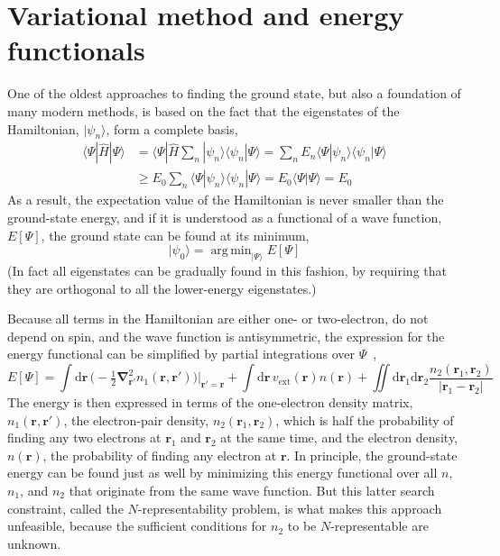\section{Variational method and energy functionals}

One of the oldest approaches to finding the ground state, but also a foundation of many modern methods, is based on the fact that the eigenstates of the Hamiltonian, $|\psi_n\rangle$, form a complete basis,
\begin{equation}
\begin{aligned}
  \langle\Psi|\hat H|\Psi\rangle
  &=\langle\Psi|\hat H\sum_n|\psi_n\rangle\langle\psi_n|\Psi\rangle
  =\sum_n E_n\langle\Psi|\psi_n\rangle\langle\psi_n|\Psi\rangle \\
  &\geq E_0\sum_n\langle\Psi|\psi_n\rangle\langle\psi_n|\Psi\rangle=E_0\langle\Psi|\Psi\rangle=E_0
\end{aligned}
\end{equation}
As a result, the expectation value of the Hamiltonian is never smaller than the ground-state energy, and if it is understood as a functional of a wave function, $E[\Psi]$, the ground state can be found at its minimum,
\begin{equation}
  |\psi_0\rangle=\displaystyle\operatorname{arg\,min}_{|\Psi\rangle}E[\Psi]
\end{equation}
(In fact all eigenstates can be gradually found in this fashion, by requiring that they are orthogonal to all the lower-energy eigenstates.)

Because all terms in the Hamiltonian are either one- or two-electron, do not depend on spin, and the wave function is antisymmetric, the expression for the energy functional can be simplified by partial integrations over $\Psi$~\cite{Parr89},
\begin{equation}
  E[\Psi]=\int\mathrm d\mathbf r\,\big(-\tfrac12\boldsymbol\nabla_{\mathbf r'}^2 n_1(\mathbf r,\mathbf r')\!\big)\big|_{\mathbf r'=\mathbf r}+\int\mathrm d\mathbf r\,v_\text{ext}(\mathbf r)n(\mathbf r)+\iint\mathrm d\mathbf r_1\mathrm d\mathbf r_2\frac{n_2(\mathbf r_1,\mathbf r_2)}{|\mathbf r_1-\mathbf r_2|}
  \label{eq:master-energy-functional}
\end{equation}
The energy is then expressed in terms of the one-electron density matrix, $n_1(\mathbf r,\mathbf r')$, the electron-pair density, $n_2(\mathbf r_1,\mathbf r_2)$, which is half the probability of finding any two electrons at $\mathbf r_1$ and $\mathbf r_2$ at the same time, and the electron density, $n(\mathbf r)$, the probability of finding any electron at $\mathbf r$.
In principle, the ground-state energy can be found just as well by minimizing this energy functional over all $n$, $n_1$, and $n_2$ that originate from the same wave function.
But this latter search constraint, called the $N$-representability problem, is what makes this approach unfeasible, because the sufficient conditions for $n_2$ to be $N$-representable are unknown.
\citet{LevyPNAS79}


